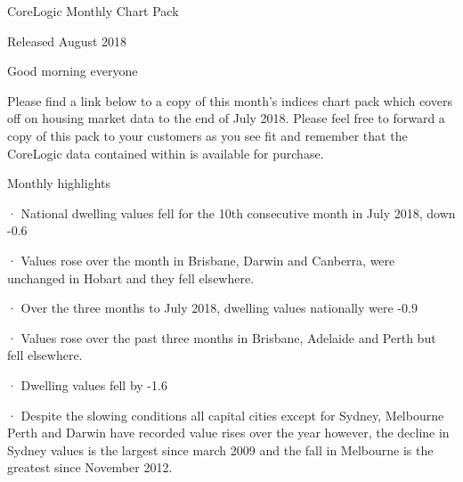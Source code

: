 \begin{comment}



Sample citation of Nash paper \cite{Nash}.

References here (manual or bibTeX). If you are using bibTeX, add your bib file 
name in place of BibFile in the bibliography command.

\end{comment}



CoreLogic Monthly Chart Pack

Released August 2018

Good morning everyone

Please find a link below to a copy of this month’s indices chart pack which covers off on housing market data to the end of July 2018.  Please feel free to forward a copy of this pack to your customers as you see fit and remember that the CoreLogic data contained within is available for purchase. 

 Monthly highlights

·       National dwelling values fell for the 10th consecutive month in July 2018, down 
-0.6%

·       Values rose over the month in Brisbane, Darwin and Canberra, were unchanged in Hobart and they fell elsewhere.

·       Over the three months to July 2018, dwelling values nationally were -0.9%

·       Values rose over the past three months in Brisbane, Adelaide and Perth but fell elsewhere.

·       Dwelling values fell by -1.6%

·       Despite the slowing conditions all capital cities except for Sydney, Melbourne Perth and Darwin have recorded value rises over the year however, the decline in Sydney values is the largest since march 2009 and the fall in Melbourne is the greatest since November 2012.   

